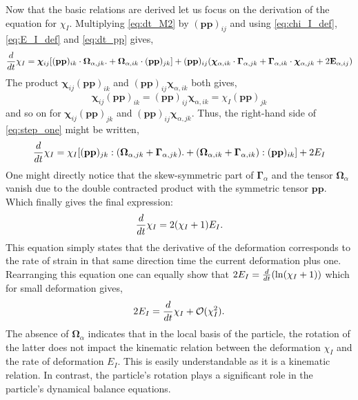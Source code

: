 Now that the basic relations are derived let us focus on the derivation of the equation for $\chi_I$. 
Multiplying \ref{eq:dt_M2} by $(\textbf{pp})_{ij}$ and using \ref{eq:chi_I_def},\ref{eq:E_I_def} and  \ref{eq:dt_pp} gives, 
\begin{equation}
    \ddt \chi_I
    = 
    \bm\chi_{ij} [(\textbf{pp})_{ik}\cdot\bm\Omega_{\alpha,jk}. 
    +\bm\Omega_{\alpha,ik}\cdot (\textbf{pp})_{jk}]
    + (\textbf{pp})_{ij}(\bm\chi_{\alpha,ik} \cdot \bm\Gamma_{\alpha,jk}
    + \bm\Gamma_{\alpha,ik} \cdot \bm\chi_{\alpha,jk}
    + 2\textbf{E}_{\alpha,ij})
    \label{eq:step_one}
\end{equation}
The product $\bm\chi_{ij} (\textbf{pp})_{ik}$ and $(\textbf{pp})_{ij}\bm\chi_{\alpha,ik}$ both gives, 
\begin{equation*}
    \bm\chi_{ij} (\textbf{pp})_{ik}
    =
    (\textbf{pp})_{ij}\bm\chi_{\alpha,ik}
    = 
    \chi_I (\textbf{pp})_{jk}
\end{equation*}
and so on for $\bm\chi_{ij} (\textbf{pp})_{jk}$ and $(\textbf{pp})_{ij} \bm\chi_{\alpha,jk}$. 
Thus, the right-hand side of \ref{eq:step_one} might be written, 
\begin{equation}
    \ddt \chi_I
    = 
    \chi_I [(\textbf{pp})_{jk}:(\bm\Omega_{\alpha,jk} + \bm\Gamma_{\alpha,jk}). 
    +(\bm\Omega_{\alpha,ik} + \bm\Gamma_{\alpha,ik}) :(\textbf{pp})_{ik}]
    + 2E_I
    \label{eq:step_two}
\end{equation}
One might directly notice that the skew-symmetric part of $\bm\Gamma_\alpha$ and the tensor $\bm\Omega_\alpha$ vanish due to the double contracted product with the symmetric tensor $\textbf{pp}$. 
Which finally gives the final expression: 
\begin{equation}
    \ddt \chi_I
    = 
    2(\chi_I +1)E_I. 
    \label{eq:dt_chi_I}
\end{equation}
This equation simply states that the derivative of the deformation corresponds to the rate of strain in that same direction time the current deformation plus one.  
Rearranging this equation one can equally show that $2E_I = \frac{d}{dt} (\ln(\chi_I+1))$ which for small deformation gives,
\begin{equation}
    2E_I =  \ddt \chi_I + \mathcal{O}(\chi_I^2). 
    \label{eq:small_def}
\end{equation}
The absence of $\bm\Omega_\alpha$ indicates that in the local basis of the particle, the rotation of the latter does not impact the kinematic relation between the deformation $\chi_I$ and the rate of deformation $E_I$.
This is easily understandable as it is a kinematic relation. 
In contrast, the particle's rotation plays a significant role in the particle's dynamical balance equations.


